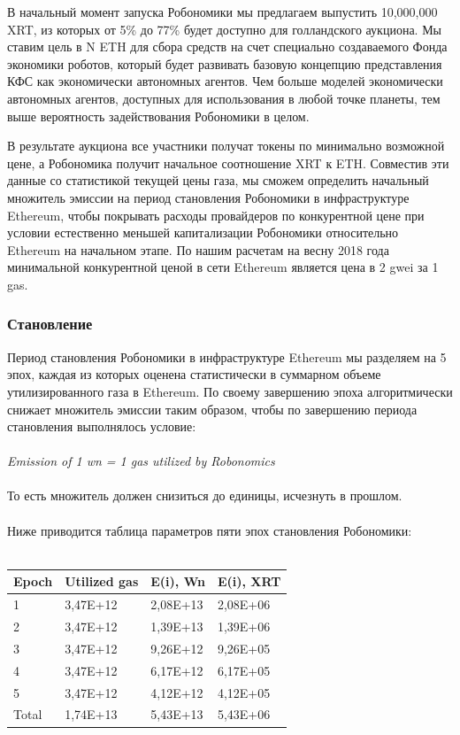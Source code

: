 \documentclass{article}
\begin{document}
В начальный момент запуска Робономики мы предлагаем выпустить 10,000,000 XRT, из которых от 5\% до 77\% будет доступно для голландского аукциона. Мы ставим цель в  N ETH для сбора средств на счет специально создаваемого Фонда экономики роботов, который будет развивать базовую концепцию представления КФС как экономически автономных агентов. Чем больше моделей экономически автономных агентов, доступных для использования в любой точке планеты, тем выше вероятность задействования Робономики в целом.

В результате аукциона все участники получат токены по минимально возможной цене, а Робономика получит начальное соотношение XRT к ETH. Совместив эти данные со статистикой текущей цены газа, мы сможем определить начальный множитель эмиссии на период становления Робономики в инфраструктуре Ethereum, чтобы покрывать расходы провайдеров по конкурентной цене при условии естественно меньшей капитализации Робономики относительно Ethereum на начальном этапе. По нашим расчетам на весну 2018 года минимальной конкурентной ценой в сети Ethereum является цена в 2 gwei за 1 gas. 


\subsubsection{Становление}

Период становления Робономики в инфраструктуре Ethereum мы разделяем на 5 эпох, каждая из которых оценена статистически в суммарном объеме утилизированного газа в Ethereum. По своему завершению эпоха алгоритмически снижает множитель эмиссии таким образом, чтобы по завершению периода становления выполнялось условие:
\\
\\
\textit{Emission of 1 wn = 1 gas utilized by Robonomics}
\\
\\
То есть множитель должен снизиться до единицы, исчезнуть в прошлом.
\\
\\
Ниже приводится таблица параметров пяти эпох становления Робономики:
\\
\\
\begin{tabular}{ |l |l |l |l}
 \textbf{Epoch} & \textbf{Utilized gas} & \textbf{E(i), Wn} & \textbf{E(i), XRT} \\ 
 \hline
 1 &  3,47E+12 & 2,08E+13 & 2,08E+06 \\ 
 2 &  3,47E+12 & 1,39E+13 & 1,39E+06 \\ 
 3 &  3,47E+12 & 9,26E+12 & 9,26E+05 \\ 
 4 &  3,47E+12 & 6,17E+12 & 6,17E+05 \\ 
 5 &  3,47E+12 & 4,12E+12 & 4,12E+05 \\ 
 Total &  1,74E+13 & 5,43E+13 & 5,43E+06 \\ 
\end{tabular}
\end{document}
